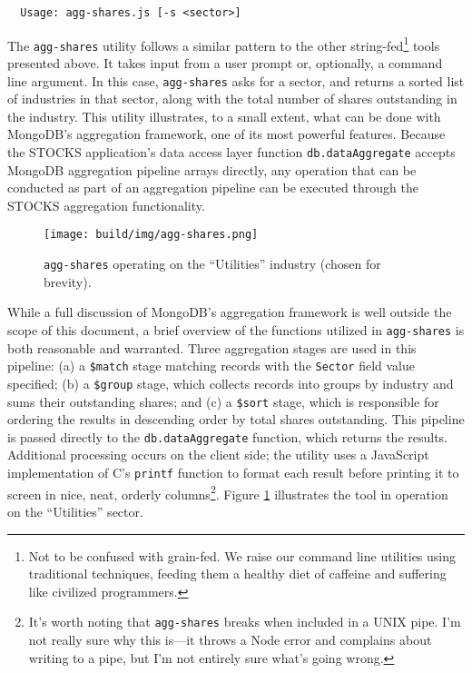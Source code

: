 \documentclass[
11pt,
titlepage,
]{article}
\begin{document}
\begin{lstlisting}
  Usage: agg-shares.js [-s <sector>]
\end{lstlisting}

The \texttt{agg-shares} utility follows a similar pattern to the other
string-fed\footnote{Not to be confused with grain-fed. We raise our command line
utilities using traditional techniques, feeding them a healthy diet of caffeine
and suffering like civilized programmers.} tools presented above. It takes input
from a user prompt or, optionally, a command line argument. In this case,
\texttt{agg-shares} asks for a sector, and returns a sorted list of industries
in that sector, along with the total number of shares outstanding in the
industry. This utility illustrates, to a small extent, what can be done with
MongoDB's aggregation framework, one of its most powerful features. Because the
STOCKS application's data access layer function \texttt{db.dataAggregate}
accepts MongoDB aggregation pipeline arrays directly, any operation that can be
conducted as part of an aggregation pipeline can be executed through the STOCKS
aggregation functionality.

\begin{figure}[tp]
  \texttt{[image: build/img/agg-shares.png]}
  \caption{\texttt{agg-shares} operating on the ``Utilities'' industry (chosen
    for brevity).}
  \label{fig:agg-shares}
\end{figure}

While a full discussion of MongoDB's aggregation framework is well outside the
scope of this document, a brief overview of the functions utilized in
\texttt{agg-shares} is both reasonable and warranted. Three aggregation stages
are used in this pipeline: (a) a \texttt{\$match} stage matching records
with the \texttt{Sector} field value specified; (b) a \texttt{\$group} stage,
which collects records into groups by industry and sums their outstanding
shares; and (c) a \texttt{\$sort} stage, which is responsible for ordering the
results in descending order by total shares outstanding. This pipeline is passed
directly to the \texttt{db.dataAggregate} function, which returns the results.
Additional processing occurs on the client side; the utility uses a JavaScript
implementation of C's \texttt{printf} function to format each result before
printing it to screen in nice, neat, orderly columns\footnote{It's worth noting
  that \texttt{agg-shares} breaks when included in a UNIX pipe. I'm not really
  sure why this is---it throws a Node error and complains about writing to a
  pipe, but I'm not entirely sure what's going wrong.}. Figure
\ref{fig:agg-shares} illustrates the tool in operation on the ``Utilities''
sector.
\end{document}
